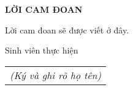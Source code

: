 \documentclass[../main.tex]{subfiles}
\begin{document}
\begin{center}
    \Large{\textbf{LỜI CAM ĐOAN}}\\
\end{center}
\vspace{1cm}

Lời cam đoan sẽ được viết ở đây.

\begin{flushright}
Sinh viên thực hiện\\
\begin{tabular}{@{}c@{}}
\textit{(Ký và ghi rõ họ tên)}
\end{tabular}
\end{flushright}
\end{document}
